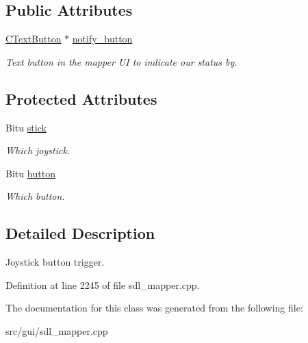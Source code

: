 \subsection*{Public Attributes}
\begin{DoxyCompactItemize}
\item 
\hypertarget{classCJButtonEvent_ac8c89511fdc9a86b4c187eec432445d2}{\hyperlink{classCTextButton}{C\-Text\-Button} $\ast$ \hyperlink{classCJButtonEvent_ac8c89511fdc9a86b4c187eec432445d2}{notify\-\_\-button}}\label{classCJButtonEvent_ac8c89511fdc9a86b4c187eec432445d2}

\begin{DoxyCompactList}\small\item\em Text button in the mapper U\-I to indicate our status by. \end{DoxyCompactList}\end{DoxyCompactItemize}
\subsection*{Protected Attributes}
\begin{DoxyCompactItemize}
\item 
\hypertarget{classCJButtonEvent_aa87062af5d8bc5db801066e2eb4a74f8}{Bitu \hyperlink{classCJButtonEvent_aa87062af5d8bc5db801066e2eb4a74f8}{stick}}\label{classCJButtonEvent_aa87062af5d8bc5db801066e2eb4a74f8}

\begin{DoxyCompactList}\small\item\em Which joystick. \end{DoxyCompactList}\item 
\hypertarget{classCJButtonEvent_abdbfaa23915b89b1392129c9525dd58d}{Bitu \hyperlink{classCJButtonEvent_abdbfaa23915b89b1392129c9525dd58d}{button}}\label{classCJButtonEvent_abdbfaa23915b89b1392129c9525dd58d}

\begin{DoxyCompactList}\small\item\em Which button. \end{DoxyCompactList}\end{DoxyCompactItemize}


\subsection{Detailed Description}
Joystick button trigger. 

Definition at line 2245 of file sdl\-\_\-mapper.\-cpp.



The documentation for this class was generated from the following file\-:\begin{DoxyCompactItemize}
\item 
src/gui/sdl\-\_\-mapper.\-cpp\end{DoxyCompactItemize}
